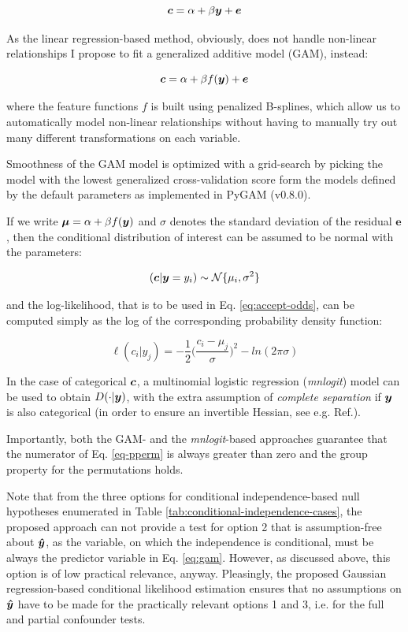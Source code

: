 \documentclass{article}
\begin{document}
\begin{equation}
    \label{eq:linreg}
    \boldsymbol{c} = \alpha + \beta \boldsymbol{y} + \boldsymbol{e}
\end{equation}

As the linear regression-based method, obviously, does not handle non-linear relationships I propose to fit a generalized additive model (GAM)\citep{hastie1987generalized}, instead:

\begin{equation}
    \label{eq:gam}
    \boldsymbol{c} = \alpha + \beta f(\boldsymbol{y}) + \boldsymbol{e}
\end{equation}

where the feature functions $f$ is built using penalized B-splines, which allow us to automatically model non-linear relationships without having to manually try out many different transformations on each variable.

Smoothness of the GAM model is optimized with a grid-search by picking the model with the lowest generalized cross-validation score form the models defined by the default parameters as implemented in PyGAM\citep{serven2018generalized} (v0.8.0).

If we write $\boldsymbol{\mu} = \alpha + \beta f(\boldsymbol{y})$ and $\sigma$ denotes the standard deviation of the residual $\boldsymbol{e}$, then the conditional distribution of interest can be assumed to be normal with the parameters:

$$ (\boldsymbol{c}|\boldsymbol{y}=y_i) \sim \mathcal{N}\{\mu_i, \sigma^2\}$$

and the log-likelihood, that is to be used in Eq. \ref{eq:accept-odds}, can be computed simply as the log of the corresponding probability density function:

$$ \ell(c_i|y_j) = - \frac{1}{2} \Big(\frac{c_i-\mu_j}{\sigma}\Big)^2 - ln(2 \pi \sigma)   $$

In the case of categorical $\boldsymbol{c}$, a multinomial logistic regression (\emph{mnlogit}) model can be used to obtain $D(\cdot|\boldsymbol{y})$, with the extra assumption of \emph{complete separation} if $\boldsymbol{y}$ is also categorical (in order to ensure an invertible Hessian, see e.g. Ref.\citep{bennett1966multiple, jones1975proability}).

Importantly, both the GAM- and the \emph{mnlogit}-based approaches guarantee that the numerator of Eq. \ref{eq-pperm} is always greater than zero and the group property for the permutations holds.

Note that from the three options for conditional independence-based null hypotheses enumerated in Table \ref{tab:conditional-independence-cases}, the proposed approach can not provide a test for option 2 that is assumption-free about $\boldsymbol{\hat{y}}$, as the variable, on which the independence is conditional, must be always the predictor variable in Eq. \ref{eq:gam}. However, as discussed above, this option is of low practical relevance, anyway.
Pleasingly,  the proposed Gaussian regression-based conditional likelihood estimation ensures that no assumptions on $\boldsymbol{\hat{y}}$ have to be made for the practically relevant options 1 and 3, i.e. for the full and partial confounder tests.
\end{document}
